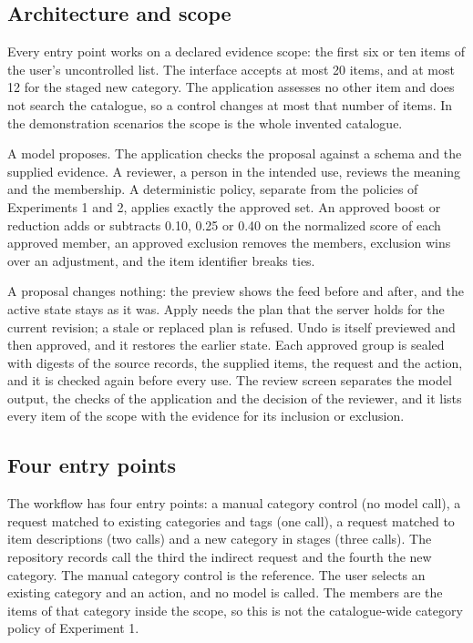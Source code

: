 \documentclass[conference]{IEEEtran}
\begin{document}
\subsection{Architecture and scope}
Every entry point works on a declared evidence scope: the first six or ten items of the user's uncontrolled list. The interface accepts at most 20 items, and at most 12 for the staged new category. The application assesses no other item and does not search the catalogue, so a control changes at most that number of items. In the demonstration scenarios the scope is the whole invented catalogue.

A model proposes. The application checks the proposal against a schema and the supplied evidence. A reviewer, a person in the intended use, reviews the meaning and the membership. A deterministic policy, separate from the policies of Experiments 1 and 2, applies exactly the approved set. An approved boost or reduction adds or subtracts 0.10, 0.25 or 0.40 on the normalized score of each approved member, an approved exclusion removes the members, exclusion wins over an adjustment, and the item identifier breaks ties.

A proposal changes nothing: the preview shows the feed before and after, and the active state stays as it was. Apply needs the plan that the server holds for the current revision; a stale or replaced plan is refused. Undo is itself previewed and then approved, and it restores the earlier state. Each approved group is sealed with digests of the source records, the supplied items, the request and the action, and it is checked again before every use. The review screen separates the model output, the checks of the application and the decision of the reviewer, and it lists every item of the scope with the evidence for its inclusion or exclusion.

\subsection{Four entry points}\label{sec:entry}
The workflow has four entry points: a manual category control (no model call), a request matched to existing categories and tags (one call), a request matched to item descriptions (two calls) and a new category in stages (three calls). The repository records call the third the indirect request and the fourth the new category. The manual category control is the reference. The user selects an existing category and an action, and no model is called. The members are the items of that category inside the scope, so this is not the catalogue-wide category policy of Experiment 1.
\end{document}
